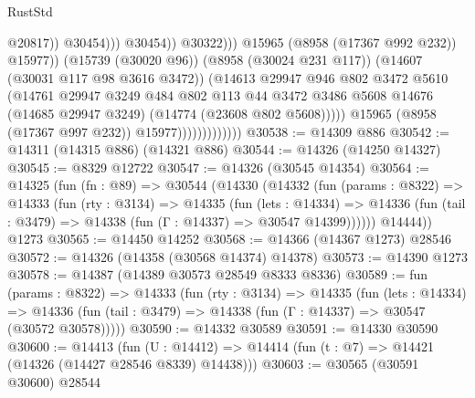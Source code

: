 \begin{lexlean}{RustStd}
\begin{coremodule}
                                                        @20817))
                                                    @30454)))
                                              @30454))
                                          @30322)))
                                    @15965
                                    (@8958 (@17367 @992 @232))
                                    @15977))
                                (@15739 (@30020 @96))
                                (@8958 (@30024 @231 @117))
                                (@14607 (@30031 @117 @98 @3616 @3472))
                                (@14613
                                  @29947
                                  @946
                                  @802
                                  @3472
                                  @5610
                                  (@14761
                                    @29947
                                    @3249
                                    @484
                                    @802
                                    @113
                                    @44
                                    @3472
                                    @3486
                                    @5608
                                    @14676
                                    (@14685 @29947 @3249)
                                    (@14774 (@23608 @802 @5608)))))
                              @15965
                              (@8958 (@17367 @997 @232))
                              @15977)))))))))))))
@30538 := @14309 @886
@30542 := @14311 (@14315 @886) (@14321 @886)
@30544 := @14326 (@14250 @14327)
@30545 := @8329 @12722
@30547 := @14326 (@30545 @14354)
@30564 := @14325
    (fun (fn : @89) =>
    @30544
      (@14330
        (@14332
          (fun (params : @8322) =>
          @14333
            (fun (rty : @3134) =>
            @14335
              (fun (lets : @14334) =>
              @14336 (fun (tail : @3479) => @14338 (fun (Γ : @14337) => @30547 @14399))))))
        @14444))
    @1273
@30565 := @14450 @14252
@30568 := @14366 (@14367 @1273) @28546
@30572 := @14326 (@14358 (@30568 @14374) @14378)
@30573 := @14390 @1273
@30578 := @14387 (@14389 @30573 @28549 @8333 @8336)
@30589 := fun (params : @8322) =>
  @14333
    (fun (rty : @3134) =>
    @14335
      (fun (lets : @14334) =>
      @14336 (fun (tail : @3479) => @14338 (fun (Γ : @14337) => @30547 (@30572 @30578)))))
@30590 := @14332 @30589
@30591 := @14330 @30590
@30600 := @14413
    (fun (U : @14412) => @14414 (fun (t : @7) => @14421 (@14326 (@14427 @28546 @8339) @14438)))
@30603 := @30565 (@30591 @30600) @28544

\end{coremodule}
\end{lexlean}
